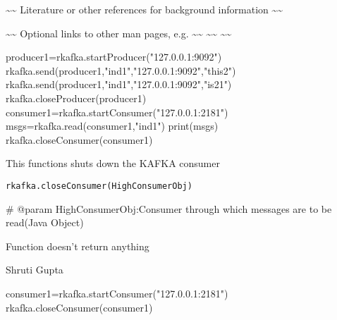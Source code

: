 \documentclass[letterpaper]{book}
\begin{document}
%
\begin{References}\relax
\textasciitilde{}\textasciitilde{} Literature or other references for background information \textasciitilde{}\textasciitilde{}
\end{References}
%
\begin{SeeAlso}\relax
\textasciitilde{}\textasciitilde{} Optional links to other man pages, e.g. \textasciitilde{}\textasciitilde{}
\textasciitilde{}\textasciitilde{}  \textasciitilde{}\textasciitilde{}
\end{SeeAlso}
%
\begin{Examples}
\begin{ExampleCode}
producer1=rkafka.startProducer("127.0.0.1:9092")
rkafka.send(producer1,"ind1","127.0.0.1:9092","this2")
rkafka.send(producer1,"ind1","127.0.0.1:9092","is21")
rkafka.closeProducer(producer1)
consumer1=rkafka.startConsumer("127.0.0.1:2181")
msgs=rkafka.read(consumer1,"ind1")
print(msgs)
rkafka.closeConsumer(consumer1)
\end{ExampleCode}
\end{Examples}
%
\begin{Description}\relax
This functions shuts down the KAFKA consumer
\end{Description}
%
\begin{Usage}
\begin{verbatim}
rkafka.closeConsumer(HighConsumerObj)
\end{verbatim}
\end{Usage}
%
\begin{Arguments}
\begin{ldescription}
\item[\code{HighConsumerObj}] 
\#  	  @param HighConsumerObj:Consumer through which messages are to be read(Java Object)	

\end{ldescription}
\end{Arguments}
%
\begin{Value}
Function doesn't return anything
\end{Value}
%
\begin{Author}\relax
Shruti Gupta
\end{Author}
%
\begin{Examples}
\begin{ExampleCode}
consumer1=rkafka.startConsumer("127.0.0.1:2181")
rkafka.closeConsumer(consumer1)
\end{ExampleCode}
\end{Examples}
\end{document}
